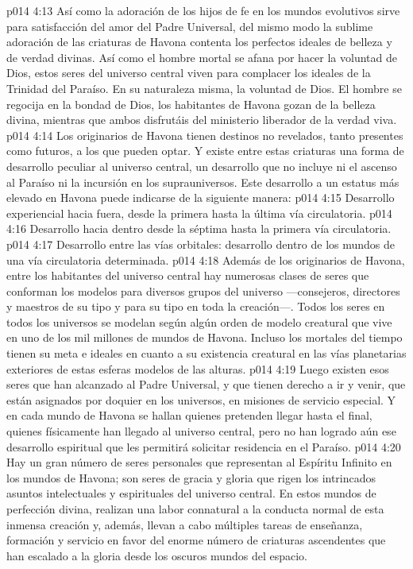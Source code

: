 \vs p014 4:13 Así como la adoración de los hijos de fe en los mundos evolutivos sirve para satisfacción del amor del Padre Universal, del mismo modo la sublime adoración de las criaturas de Havona contenta los perfectos ideales de belleza y de verdad divinas. Así como el hombre mortal se afana por hacer la voluntad de Dios, estos seres del universo central viven para complacer los ideales de la Trinidad del Paraíso. En su naturaleza misma,  la voluntad de Dios. El hombre se regocija en la bondad de Dios, los habitantes de Havona gozan de la belleza divina, mientras que ambos disfrutáis del ministerio liberador de la verdad viva.
\vs p014 4:14 Los originarios de Havona tienen destinos no revelados, tanto presentes como futuros, a los que pueden optar. Y existe entre estas criaturas una forma de desarrollo peculiar al universo central, un desarrollo que no incluye ni el ascenso al Paraíso ni la incursión en los suprauniversos. Este desarrollo a un estatus más elevado en Havona puede indicarse de la siguiente manera:
\vs p014 4:15 Desarrollo experiencial hacia fuera, desde la primera hasta la última vía circulatoria.
\vs p014 4:16 Desarrollo hacia dentro desde la séptima hasta la primera vía circulatoria.
\vs p014 4:17 Desarrollo entre las vías orbitales: desarrollo dentro de los mundos de una vía circulatoria determinada.
\vs p014 4:18 \pc Además de los originarios de Havona, entre los habitantes del universo central hay numerosas clases de seres que conforman los modelos para diversos grupos del universo ---consejeros, directores y maestros de su tipo y para su tipo en toda la creación---. Todos los seres en todos los universos se modelan según algún orden de modelo creatural que vive en uno de los mil millones de mundos de Havona. Incluso los mortales del tiempo tienen su meta e ideales en cuanto a su existencia creatural en las vías planetarias exteriores de estas esferas modelos de las alturas.
\vs p014 4:19 Luego existen esos seres que han alcanzado al Padre Universal, y que tienen derecho a ir y venir, que están asignados por doquier en los universos, en misiones de servicio especial. Y en cada mundo de Havona se hallan quienes pretenden llegar hasta el final, quienes físicamente han llegado al universo central, pero no han logrado aún ese desarrollo espiritual que les permitirá solicitar residencia en el Paraíso.
\vs p014 4:20 Hay un gran número de seres personales que representan al Espíritu Infinito en los mundos de Havona; son seres de gracia y gloria que rigen los intrincados asuntos intelectuales y espirituales del universo central. En estos mundos de perfección divina, realizan una labor connatural a la conducta normal de esta inmensa creación y, además, llevan a cabo múltiples tareas de enseñanza, formación y servicio en favor del enorme número de criaturas ascendentes que han escalado a la gloria desde los oscuros mundos del espacio.
